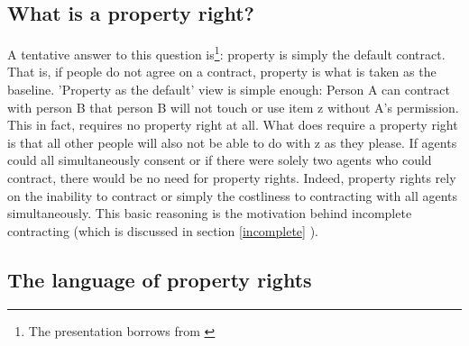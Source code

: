 
\subsection{What is a property right?}

A tentative answer to this question is\footnote{The presentation borrows from \cite{Munzer1990}}: property is simply the default contract. That is, if people do not agree on a contract, property is what is taken as the baseline. 'Property as the default' view is simple enough: Person A can contract with person B that person B will not touch or use item z without A's permission. This in fact, requires no property right at all. What does require a property right is that all other people will also not be able to do with z as they please. If agents could all simultaneously consent or if there were solely two agents who could contract, there would be no need for property rights. Indeed, property rights rely on the inability to contract or simply the costliness to contracting with all agents simultaneously. This basic reasoning is the motivation behind incomplete contracting (which is discussed in section \ref{incomplete} ).


\subsection{The language of property rights}

